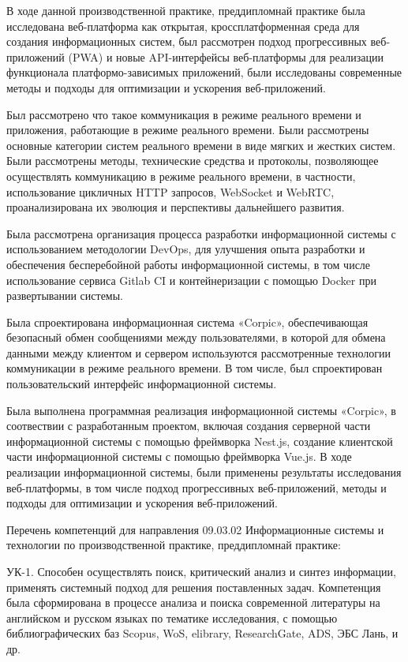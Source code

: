 \conclusion
В ходе данной производственной практике, преддипломнай практике была исследована веб-платформа как открытая, кроссплатформенная среда для создания информационных систем, был рассмотрен подход прогрессивных веб-приложений (PWA) и новые API-интерфейсы веб-платформы для реализации функционала платформо-зависимых приложений, были исследованы современные методы и подходы для оптимизации и ускорения веб-приложений.

Был рассмотрено что такое коммуникация в режиме реального времени и приложения, работающие в режиме реального времени. Были рассмотрены основные категории систем реального времени в виде мягких и жестких систем. Были рассмотрены методы, технические средства и протоколы, позволяющее осуществлять коммуникацию в режиме реального времени, в частности, использование цикличных HTTP запросов, WebSocket и WebRTC, проанализирована их эволюция и перспективы дальнейшего развития.

Была рассмотрена организация процесса разработки информационной системы с использованием методологии DevOps, для улучшения опыта разработки и обеспечения бесперебойной работы информационной системы, в том числе использование сервиса Gitlab CI и контейнеризации с помощью Docker при развертывании системы.

Была спроектирована информационная система «Corpic», обеспечивающая безопасный обмен сообщениями между пользователями, в которой для обмена данными между клиентом и сервером используются рассмотренные технологии коммуникации в режиме реального времени. В том числе, был спроектирован пользовательский интерфейс информационной системы.

Была выполнена программная реализация информационной системы «Corpic», в соотвествии с разработанным проектом, включая создания серверной части информационной системы с помощью фреймворка Nest.js, создание клиентской части информационной системы с помощью фреймворка Vue.js. В ходе реализации информационной системы, были применены результаты исследования веб-платформы, в том числе подход прогрессивных веб-приложений, методы и подходы для оптимизации и ускорения веб-приложений.

Перечень компетенций для направления 09.03.02 Информационные системы
и технологии по производственной практике, преддипломнай практике:

УК-1. Способен осуществлять поиск, критический анализ и синтез информации, применять системный подход для решения поставленных задач. Компетенция была сформирована в процессе анализа и поиска современной литературы на английском и русском языках по тематике исследования, с помощью библиографических баз Scopus, WoS, elibrary, ResearchGate, ADS, ЭБС Лань, и др.

